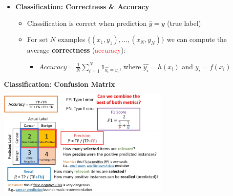 \documentclass[10pt,landscape]{article}
\begin{document}
\begin{multicols*}{3}
\begin{itemize}[topsep=0pt,noitemsep,wide=0pt, leftmargin=\dimexpr{} + 2\relax]
\begin{itemize}[topsep=0pt,noitemsep,wide=0pt, leftmargin=\dimexpr{} + 2\relax]
\begin{itemize}[topsep=0pt,noitemsep,wide=0pt, leftmargin=\dimexpr{} + 2\relax]
    \end{itemize}
  \end{itemize}
  \item \textbf{Classification: Correctness \& Accuracy}
  \begin{itemize}[topsep=0pt,noitemsep,wide=0pt, leftmargin=\dimexpr{} + 2\relax]
    \item Classification is correct when prediction $\hat{y} = y$ (true label)
    \item For set $N$ examples $\{(x_1, y_1), \ldots, (x_N, y_N)\}$ we can compute the average \textbf{correctness} (\textcolor{red}{accuracy}):
    \begin{itemize}[topsep=0pt,noitemsep,wide=0pt, leftmargin=\dimexpr{} + 2\relax]
      \item $Accuracy = \frac{1}{N}\sum^N_{i=1} \mathds{1}_{\hat{y_i}=y_i}$, where $\hat{y_i} = h(x_i)$ and $y_i = f(x_i)$
    \end{itemize}
  \end{itemize}
\end{itemize}
\textbf{Classification: Confusion Matrix}
\includegraphics*[width=8.5cm, height=5.8cm]{images/confusionmatrix.png}


\end{multicols*}
\end{document}
